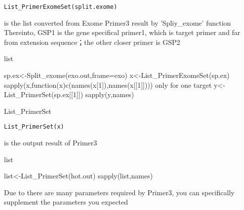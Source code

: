 \documentclass[a4paper]{book}
\begin{document}
%
\begin{Usage}
\begin{verbatim}
List_PrimerExomeSet(split.exome)
\end{verbatim}
\end{Usage}
%
\begin{Arguments}
\begin{ldescription}
\item[\code{split.exome}] is the list converted from Exome Primer3 result by 'Spliy\_exome' function
Thereinto, GSP1 is the gene specifical primer1, which is target primer and far from extension
sequence；the other closer primer is GSP2
\end{ldescription}
\end{Arguments}
%
\begin{Value}
list
\end{Value}
%
\begin{Examples}
\begin{ExampleCode}
sp.ex<-Split_exome(exo.out,frame=exo)
x<-List_PrimerExomeSet(sp.ex)
sapply(x,function(x){c(names(x[1]),names(x[[1]]))})
only for one target
y<-List_PrimerSet(sp.ex[[1]])
sapply(y,names)
\end{ExampleCode}
\end{Examples}
%
\begin{Description}\relax
List\_PrimerSet
\end{Description}
%
\begin{Usage}
\begin{verbatim}
List_PrimerSet(x)
\end{verbatim}
\end{Usage}
%
\begin{Arguments}
\begin{ldescription}
\item[\code{x}] is the output result of Primer3
\end{ldescription}
\end{Arguments}
%
\begin{Value}
list
\end{Value}
%
\begin{Examples}
\begin{ExampleCode}
list<-List_PrimerSet(hot.out)
sapply(list,names)
\end{ExampleCode}
\end{Examples}
%
\begin{Description}\relax
Due to there are many parameters required by Primer3, you can specifically supplement
the parameters you expected
\end{Description}
\end{document}
